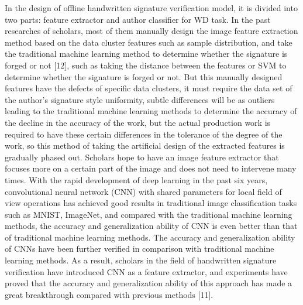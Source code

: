 In the design of offline handwritten signature verification model, it is divided into two parts: feature extractor and author classifier for WD task. In the past researches of scholars, most of them manually design the image feature extraction method based on the data cluster features such as sample distribution, and take the traditional machine learning method to determine whether the signature is forged or not [12], such as taking the distance between the features or SVM to determine whether the signature is forged or not. But this manually designed features have the defects of specific data clusters, it must require the data set of the author's signature style uniformity, subtle differences will be as outliers leading to the traditional machine learning methods to determine the accuracy of the decline in the accuracy of the work, but the actual production work is required to have these certain differences in the tolerance of the degree of the work, so this method of taking the artificial design of the extracted features is gradually phased out. Scholars hope to have an image feature extractor that focuses more on a certain part of the image and does not need to intervene many times. With the rapid development of deep learning in the past six years, convolutional neural network (CNN) with shared parameters for local field of view operations has achieved good results in traditional image classification tasks such as MNIST, ImageNet, and compared with the traditional machine learning methods, the accuracy and generalization ability of CNN is even better than that of traditional machine learning methods. The accuracy and generalization ability of CNNs have been further verified in comparison with traditional machine learning methods. As a result, scholars in the field of handwritten signature verification have introduced CNN as a feature extractor, and experiments have proved that the accuracy and generalization ability of this approach has made a great breakthrough compared with previous methods [11].

